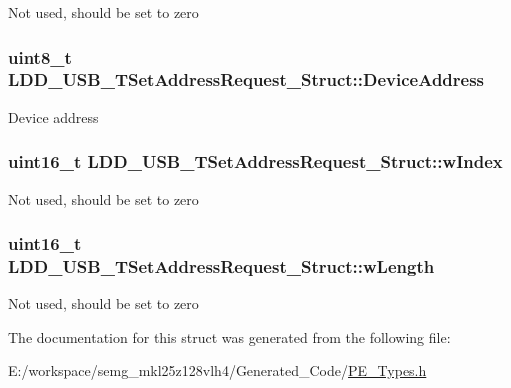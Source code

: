 Not used, should be set to zero \hypertarget{struct_l_d_d___u_s_b___t_set_address_request___struct_ac55059f77c050ba97d5f0d9b2b3a52c9}{
\subsubsection[{Device\-Address}]{\setlength{\rightskip}{0pt plus 5cm}uint8\-\_\-t L\-D\-D\-\_\-\-U\-S\-B\-\_\-\-T\-Set\-Address\-Request\-\_\-\-Struct\-::\-Device\-Address}}\label{struct_l_d_d___u_s_b___t_set_address_request___struct_ac55059f77c050ba97d5f0d9b2b3a52c9}
Device address \hypertarget{struct_l_d_d___u_s_b___t_set_address_request___struct_ab6a26adfbbc2e164679a4d7dcf5c99d0}{
\subsubsection[{w\-Index}]{\setlength{\rightskip}{0pt plus 5cm}uint16\-\_\-t L\-D\-D\-\_\-\-U\-S\-B\-\_\-\-T\-Set\-Address\-Request\-\_\-\-Struct\-::w\-Index}}\label{struct_l_d_d___u_s_b___t_set_address_request___struct_ab6a26adfbbc2e164679a4d7dcf5c99d0}
Not used, should be set to zero \hypertarget{struct_l_d_d___u_s_b___t_set_address_request___struct_adff24e6d3ec27fce1f59693aa215deda}{
\subsubsection[{w\-Length}]{\setlength{\rightskip}{0pt plus 5cm}uint16\-\_\-t L\-D\-D\-\_\-\-U\-S\-B\-\_\-\-T\-Set\-Address\-Request\-\_\-\-Struct\-::w\-Length}}\label{struct_l_d_d___u_s_b___t_set_address_request___struct_adff24e6d3ec27fce1f59693aa215deda}
Not used, should be set to zero 

The documentation for this struct was generated from the following file\-:\begin{DoxyCompactItemize}
\item 
E\-:/workspace/semg\-\_\-mkl25z128vlh4/\-Generated\-\_\-\-Code/\hyperlink{_p_e___types_8h}{P\-E\-\_\-\-Types.\-h}\end{DoxyCompactItemize}
